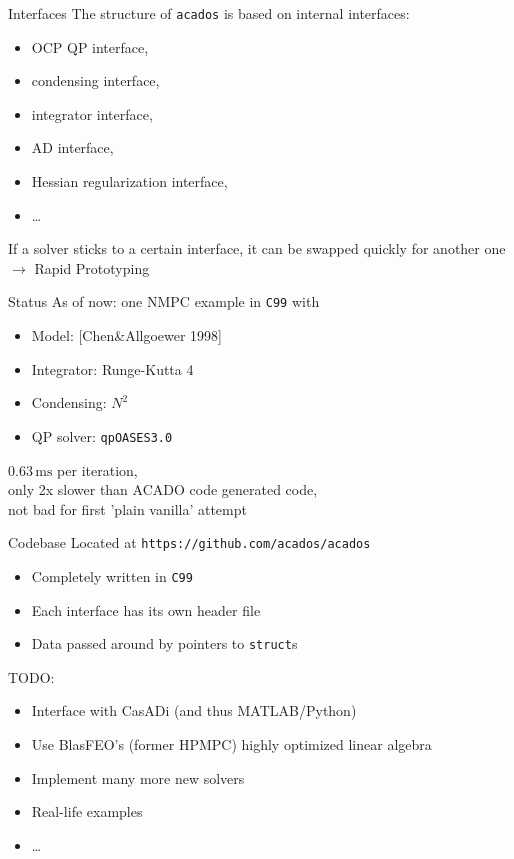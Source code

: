 \documentclass[10pt]{beamer}
\begin{document}
\begin{frame}{Interfaces}
	The structure of \texttt{acados} is based on internal interfaces:
	\begin{itemize}
		\item OCP QP interface,
		\item condensing interface,
		\item integrator interface,
		\item AD interface,
		\item Hessian regularization interface,
		\item \ldots
	\end{itemize}
	If a solver sticks to a certain interface, it can be swapped quickly for another one \\ \centering $\rightarrow$ Rapid Prototyping
\end{frame}

\begin{frame}{Status}
	As of now: one NMPC example in \texttt{C99} with
	\begin{itemize}
		\item Model: [Chen\&Allgoewer 1998]
		\item Integrator: Runge-Kutta 4
		\item Condensing: $N^2$
		\item QP solver: \texttt{qpOASES3.0}
	\end{itemize}
	\pause
	\begin{alertblock}{}
		\centering $0.63\,\mathrm{ms}$ per iteration, \\ only 2x slower than ACADO code generated code, \\ not bad for first 'plain vanilla' attempt \smiley
	\end{alertblock}
\end{frame}

\begin{frame}{Codebase}
	Located at 
	\centering \large \texttt{https://github.com/acados/acados}
	\vspace{0.5cm}
	\normalsize
	\begin{itemize}
		\item Completely written in \texttt{C99}
		\item Each interface has its own header file
		\item Data passed around by pointers to \texttt{struct}s
	\end{itemize}
	\pause
	\flushleft TODO:
	\begin{itemize}
		\item Interface with CasADi (and thus \textsc{MATLAB}/Python)
		\item Use BlasFEO's (former HPMPC) highly optimized linear algebra
		\item Implement many more new solvers
		\item Real-life examples
		\item \ldots
	\end{itemize}
\end{frame}


\end{document}
